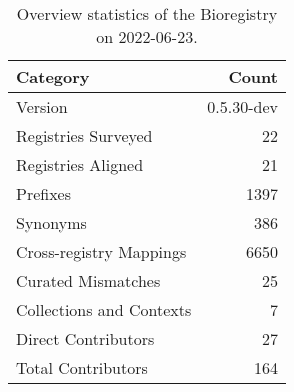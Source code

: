 \begin{table}
\centering
\caption{Overview statistics of the Bioregistry on 2022-06-23.}
\label{tab:bioregistry-summary}
\begin{tabular}{lr}
\toprule
                Category &      Count \\
\midrule
                 Version & 0.5.30-dev \\
     Registries Surveyed &         22 \\
      Registries Aligned &         21 \\
                Prefixes &       1397 \\
                Synonyms &        386 \\
 Cross-registry Mappings &       6650 \\
      Curated Mismatches &         25 \\
Collections and Contexts &          7 \\
     Direct Contributors &         27 \\
      Total Contributors &        164 \\
\bottomrule
\end{tabular}
\end{table}
